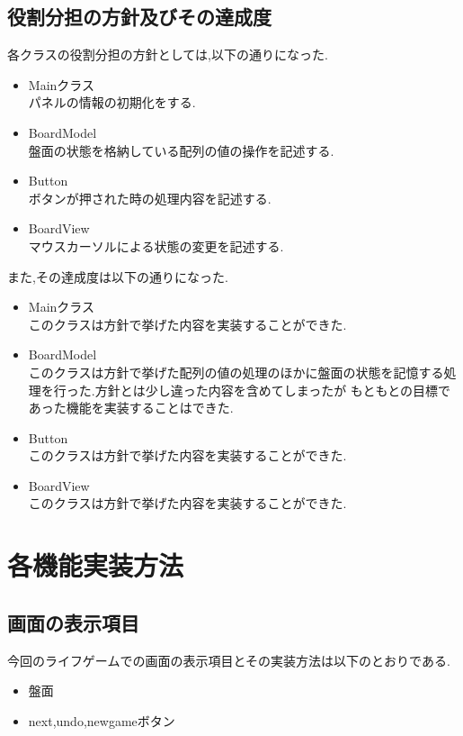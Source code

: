 \documentclass[dvipdfmx]{jarticle}
\begin{document}
\subsection{役割分担の方針及びその達成度}
各クラスの役割分担の方針としては,以下の通りになった.
\begin{itemize}
  \item Mainクラス\mbox{}\\
  パネルの情報の初期化をする.
  \item BoardModel\mbox{}\\
  盤面の状態を格納している配列の値の操作を記述する.
  \item Button\mbox{}\\
  ボタンが押された時の処理内容を記述する.
  \item BoardView\mbox{}\\
  マウスカーソルによる状態の変更を記述する.
\end{itemize}
また,その達成度は以下の通りになった.
\begin{itemize}
  \item Mainクラス\mbox{}\\
  このクラスは方針で挙げた内容を実装することができた.
  \item BoardModel\mbox{}\\
  このクラスは方針で挙げた配列の値の処理のほかに盤面の状態を記憶する処理を行った.方針とは少し違った内容を含めてしまったが
  もともとの目標であった機能を実装することはできた.
  \item Button\mbox{}\\
  このクラスは方針で挙げた内容を実装することができた.
  \item BoardView\mbox{}\\
  このクラスは方針で挙げた内容を実装することができた.
\end{itemize}
\section{各機能実装方法}

\subsection{画面の表示項目}
今回のライフゲームでの画面の表示項目とその実装方法は以下のとおりである.
\begin{itemize}
  \item 盤面
  \item next,undo,newgameボタン
\end{itemize}
\end{document}
